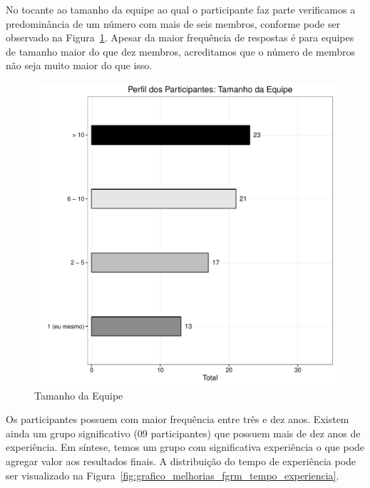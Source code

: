 No tocante ao tamanho da equipe ao qual o participante faz parte verificamos a
predominância de um número com mais de seis membros, conforme pode ser observado
na Figura~\ref{fig:grafico_melhorias_fgrm_tamanho_equipe}. Apesar da maior
frequência de respostas é para equipes de tamanho maior do que dez membros,
acreditamos que o número de membros não seja muito maior do que isso.

\begin{figure}[htpb]
	\centering
	\includegraphics[width=0.8\linewidth]{./chapter-pesquisa-com-profissionais/img/grafico_melhorias_fgrm_tamanho_equipe.pdf}
	\caption{Tamanho da Equipe}
\label{fig:grafico_melhorias_fgrm_tamanho_equipe}
\end{figure}

Os participantes possuem com maior frequência entre três e dez anos. Existem
ainda um grupo significativo (09 participantes) que possuem mais de dez anos de
experiência. Em síntese, temos um grupo com significativa experiência o que pode
agregar valor aos resultados finais. A distribuição do tempo de experiência pode
ser visualizado na Figura~\ref{fig:grafico_melhorias_fgrm_tempo_experiencia}.

